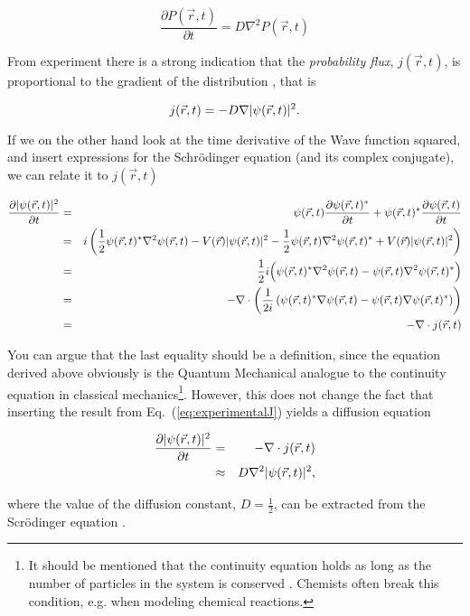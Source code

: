 \begin{equation}
 \frac{\partial P(\vec r, t)}{\partial t} = D\nabla^2 P(\vec r, t) 
 \label{Eq:diffusionSimple}
\end{equation}

From experiment there is a strong indication that the \textit{probability flux}, $j(\vec r, t)$, is proportional to the gradient of the distribution \cite{morten}, that is

\begin{equation}
 j(\vec r, t) = -D\nabla|\psi(\vec r, t)|^2.
 \label{eq:experimentalJ}
\end{equation}

If we on the other hand look at the time derivative of the Wave function squared, and insert expressions for the Schr\"odinger equation (and its complex conjugate), we can relate it to $j(\vec r, t)$  

\begin{eqnarray*}
 \frac{\partial |\psi(\vec r, t)|^2}{\partial t} &=& \psi(\vec r, t)\frac{\partial \psi(\vec r, t)^\ast}{\partial t} + \psi(\vec r, t)^\ast\frac{\partial \psi(\vec r, t)}{\partial t} \\
  &=& i\left(\frac{1}{2}\psi(\vec r, t)^\ast\nabla^2\psi(\vec r, t) - V(\vec r)|\psi(\vec r, t)|^2 - \frac{1}{2}\psi(\vec r, t)\nabla^2\psi(\vec r, t)^\ast+ V(\vec r)|\psi(\vec r, t)|^2 \right) \\
  &=& \frac{1}{2}i\Big(\psi(\vec r, t)^\ast\nabla^2\psi(\vec r, t)-\psi(\vec r, t)\nabla^2\psi(\vec r, t)^\ast\Big) \\
  &=& -\nabla\cdot\left(\frac{1}{2i}\left(\psi(\vec r, t)^\ast\nabla\psi(\vec r, t)-\psi(\vec r, t)\nabla\psi(\vec r, t)^\ast\right)\right) \\
  &=& -\nabla\cdot j(\vec r, t)
\end{eqnarray*}

You can argue that the last equality should be a definition, since the equation derived above obviously is the Quantum Mechanical analogue to the continuity equation in classical mechanics\footnote{It should be mentioned that the continuity equation holds as long as the number of particles in the system is conserved \cite{morten}. Chemists often break this condition, e.g. when modeling chemical reactions.}. However, this does not change the fact that inserting the result from Eq.~(\ref{eq:experimentalJ}) yields a diffusion equation

\begin{eqnarray}
 \frac{\partial |\psi(\vec r, t)|^2}{\partial t} &=& -\nabla\cdot j(\vec r, t) \nonumber \\
                                    &\approx& D\nabla^2|\psi(\vec r, t)|^2,
\end{eqnarray}

where the value of the diffusion constant, $D=\frac{1}{2}$, can be extracted from the Scr\"odinger equation \cite{abInitioMC}.

